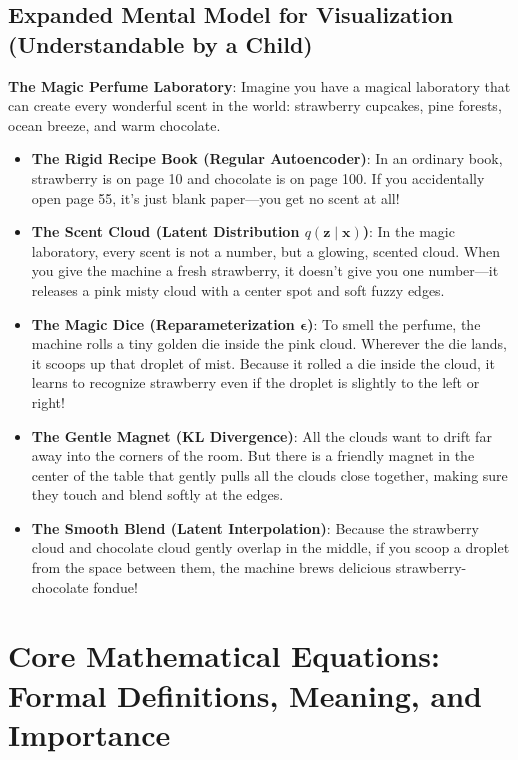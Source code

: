 \documentclass[11pt,a4paper]{article}
\theoremstyle{definition}
\begin{document}
\subsection{Expanded Mental Model for Visualization (Understandable by a Child)}
\textbf{The Magic Perfume Laboratory}:
Imagine you have a magical laboratory that can create every wonderful scent in the world: strawberry cupcakes, pine forests, ocean breeze, and warm chocolate.
\begin{itemize}
    \item \textbf{The Rigid Recipe Book (Regular Autoencoder)}:
    In an ordinary book, strawberry is on page 10 and chocolate is on page 100. If you accidentally open page 55, it's just blank paper—you get no scent at all!
    
    \item \textbf{The Scent Cloud (Latent Distribution $q(\mathbf{z} \mid \mathbf{x})$)}:
    In the magic laboratory, every scent is not a number, but a glowing, scented cloud. When you give the machine a fresh strawberry, it doesn't give you one number—it releases a pink misty cloud with a center spot and soft fuzzy edges.
    
    \item \textbf{The Magic Dice (Reparameterization $\boldsymbol{\epsilon}$)}:
    To smell the perfume, the machine rolls a tiny golden die inside the pink cloud. Wherever the die lands, it scoops up that droplet of mist. Because it rolled a die inside the cloud, it learns to recognize strawberry even if the droplet is slightly to the left or right!
    
    \item \textbf{The Gentle Magnet (KL Divergence)}:
    All the clouds want to drift far away into the corners of the room. But there is a friendly magnet in the center of the table that gently pulls all the clouds close together, making sure they touch and blend softly at the edges.
    
    \item \textbf{The Smooth Blend (Latent Interpolation)}:
    Because the strawberry cloud and chocolate cloud gently overlap in the middle, if you scoop a droplet from the space between them, the machine brews delicious strawberry-chocolate fondue!
\end{itemize}

\section{Core Mathematical Equations: Formal Definitions, Meaning, and Importance}
\end{document}
